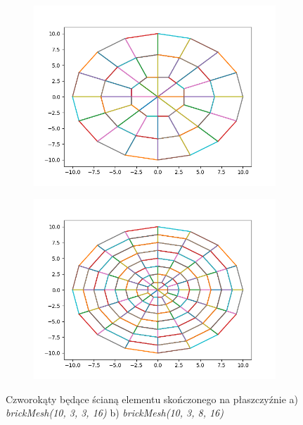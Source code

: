 \begin{figure}
\begin{subfigure}{.5\textwidth}
  \centering
  \includegraphics[width=1.0\linewidth]{Zdjecia/5/hex_czworokaty1}
  \caption{}
  \label{fig:sfig1}
\end{subfigure}
\begin{subfigure}{.5\textwidth}
  \centering
  \includegraphics[width=1.0\linewidth]{Zdjecia/5/hex_czworokaty2}
  \caption{}
  \label{fig:sfig2}
\end{subfigure}
\caption{Czworokąty będące ścianą elementu skończonego na płaszczyźnie a) \textit{brickMesh(10, 3, 3, 16)} b) \textit{brickMesh(10, 3, 8, 16)} }
\label{fig:hex_czworokaty}
\end{figure}

